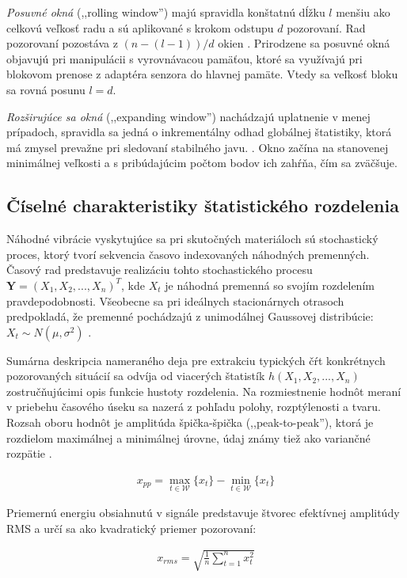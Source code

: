 \emph{Posuvné okná} (,,rolling window'') majú spravidla konštatnú dĺžku $l$
menšiu ako celkovú veľkosť radu a sú aplikované s krokom odstupu $d$ pozorovaní. Rad pozorovaní pozostáva z $ (n - (l  - 1)) / d$
okien \cite{online-anomaly-detection}. Prirodzene sa posuvné okná objavujú pri manipulácii s vyrovnávacou pamäťou, ktoré sa využívajú
pri blokovom prenose z adaptéra senzora do hlavnej pamäte. Vtedy sa veľkosť bloku sa rovná posunu $l = d$.

\emph{Rozširujúce sa okná} (,,expanding window'') nachádzajú uplatnenie v menej prípadoch, spravidla sa jedná o inkrementálny
odhad globálnej štatistiky, ktorá má zmysel prevažne pri sledovaní stabilného javu. \cite{practical-time-series}. Okno začína na
stanovenej minimálnej veľkosti a s pribúdajúcim počtom bodov ich zahŕňa, čím sa zväčšuje.

\subsection{Číselné charakteristiky štatistického rozdelenia}
Náhodné vibrácie vyskytujúce sa pri skutočných materiáloch sú stochastický proces, ktorý tvorí sekvencia časovo indexovaných
náhodných premenných. Časový rad predstavuje realizáciu tohto stochastického procesu $\mathbf{Y} = (X_1, X_2, ..., X_n)^T$, kde $X_t$
je náhodná premenná so svojím rozdelením pravdepodobnosti. Všeobecne sa pri ideálnych stacionárnych otrasoch predpokladá, že premenné
pochádzajú z unimodálnej Gaussovej distribúcie: $X_t \sim N(\mu, \sigma^2)$ \cite{vibrations-shock}.

Sumárna deskripcia nameraného deja pre extrakciu typických čŕt konkrétnych pozorovaných situácií sa odvíja od viacerých štatistík
$h(X_1, X_2, ..., X_n)$ zostručňujúcimi opis funkcie hustoty rozdelenia. Na rozmiestnenie hodnôt meraní v priebehu časového úseku
sa nazerá z pohľadu polohy, rozptýlenosti a tvaru. Rozsah oboru hodnôt je amplitúda špička-špička (,,peak-to-peak''),
ktorá je rozdielom maximálnej a minimálnej úrovne, údaj známy tiež ako variančné rozpätie \cite{zaklady-statistiky}.
\begin{ceqn}\begin{align}
x_{pp} = \max_{t \in \mathcal{W}}\{x_t\} - \min_{t \in \mathcal{W}}\{x_t\}
\end{align}\end{ceqn}

Priemernú energiu obsiahnutú v signále predstavuje štvorec efektívnej amplitúdy RMS a určí sa ako kvadratický priemer pozorovaní:
\begin{ceqn}\begin{align}
x_{rms} = \sqrt{\frac{1}{n}\sum_{t=1}^{n}{x_t^2}}
\end{align}\end{ceqn}

